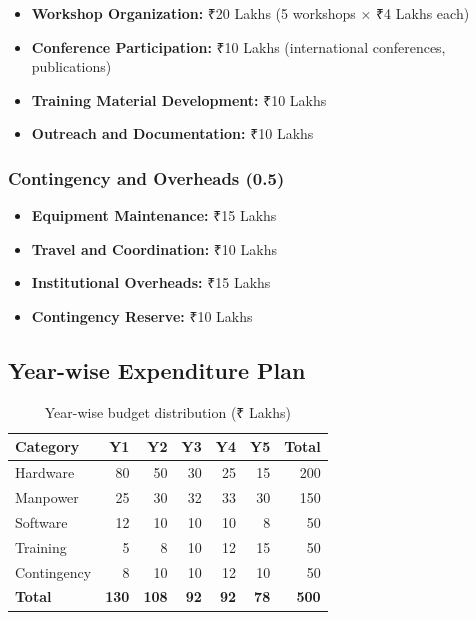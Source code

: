 \documentclass[12pt,a4paper]{article}
\newcommand{\rupees}[1]{\text{₹}#1}
\newcommand{\crore}[1]{\rupees{#1}\text{ crores}}
\theoremstyle{definition}
\begin{document}
\begin{itemize}
    \item \textbf{Workshop Organization:} ₹20 Lakhs (5 workshops × ₹4 Lakhs each)
    \item \textbf{Conference Participation:} ₹10 Lakhs (international conferences, publications)
    \item \textbf{Training Material Development:} ₹10 Lakhs
    \item \textbf{Outreach and Documentation:} ₹10 Lakhs
\end{itemize}

\subsubsection{Contingency and Overheads (\crore{0.5})}

\begin{itemize}
    \item \textbf{Equipment Maintenance:} ₹15 Lakhs
    \item \textbf{Travel and Coordination:} ₹10 Lakhs
    \item \textbf{Institutional Overheads:} ₹15 Lakhs
    \item \textbf{Contingency Reserve:} ₹10 Lakhs
\end{itemize}

\subsection{Year-wise Expenditure Plan}

\begin{table}[htbp]
\centering
\caption{Year-wise budget distribution (₹ Lakhs)}
\label{tab:yearly_budget}
\begin{tabular}{@{}lrrrrr|r@{}}
\toprule
\textbf{Category} & \textbf{Y1} & \textbf{Y2} & \textbf{Y3} & \textbf{Y4} & \textbf{Y5} & \textbf{Total} \\
\midrule
Hardware & 80 & 50 & 30 & 25 & 15 & 200 \\
Manpower & 25 & 30 & 32 & 33 & 30 & 150 \\
Software & 12 & 10 & 10 & 10 & 8 & 50 \\
Training & 5 & 8 & 10 & 12 & 15 & 50 \\
Contingency & 8 & 10 & 10 & 12 & 10 & 50 \\
\midrule
\textbf{Total} & \textbf{130} & \textbf{108} & \textbf{92} & \textbf{92} & \textbf{78} & \textbf{500} \\
\bottomrule
\end{tabular}
\end{table}
\end{document}
